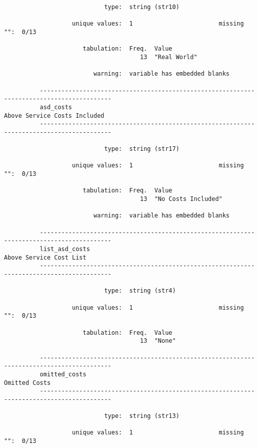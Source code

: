 \documentclass{article}
\begin{document}
\begin{verbatim}
                            type:  string (str10)
          
                   unique values:  1                        missing "":  0/13
          
                      tabulation:  Freq.  Value
                                      13  "Real World"
          
                         warning:  variable has embedded blanks
          
          ------------------------------------------------------------------------------------------
          asd_costs                                                     Above Service Costs Included
          ------------------------------------------------------------------------------------------
          
                            type:  string (str17)
          
                   unique values:  1                        missing "":  0/13
          
                      tabulation:  Freq.  Value
                                      13  "No Costs Included"
          
                         warning:  variable has embedded blanks
          
          ------------------------------------------------------------------------------------------
          list_asd_costs                                                     Above Service Cost List
          ------------------------------------------------------------------------------------------
          
                            type:  string (str4)
          
                   unique values:  1                        missing "":  0/13
          
                      tabulation:  Freq.  Value
                                      13  "None"
          
          ------------------------------------------------------------------------------------------
          omitted_costs                                                                Omitted Costs
          ------------------------------------------------------------------------------------------
          
                            type:  string (str13)
          
                   unique values:  1                        missing "":  0/13
          

\end{verbatim}
\end{document}
